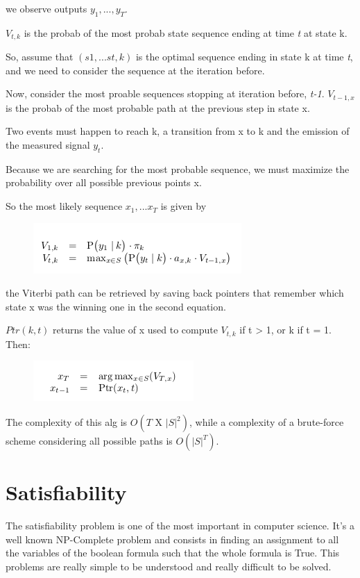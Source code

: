 \documentclass[10pt]{article}
\begin{document}
we observe outputs $ y_1, ..., y_T $.

$ V_{t,k} $ is the probab of the most probab state sequence ending at time \textit{t} at state k.

So, assume that $ (s1, ... s{t}, k) $ is the optimal sequence ending in state k at time \textit{t}, and we need to consider the sequence at the iteration before.

Now, consider the most proable sequences stopping at iteration before, \textit{t-1}. $ V_{t-1, x} $ is the probab of the most probable path at the previous step in state x. 

Two events must happen to reach k, a transition from x to k and the emission of the measured signal $ y_t $.

Because we are searching for the most probable sequence, we must maximize the probability over all possible previous points x.

So the most likely sequence $ x_1, ... x_T $ is given by

\begin{figure}[H]
\includegraphics[scale=0.60]{V}
\centering
\end{figure}

the Viterbi path can be retrieved by saving back pointers that remember which state x was the winning one in the second equation.

$ Ptr(k,t) $ returns the value of x used to compute $ V_{t,k} $ if t > 1, or k if t = 1. Then:

\begin{figure}[H]
\includegraphics[scale=0.60]{x}
\centering
\end{figure}

The complexity of this alg is $ O(T \text{ X } |S|^2) $, while a complexity of a brute-force scheme considering all possible paths is $ O(|S|^T) $.


\section{Satisfiability}
The satisfiability problem is one of the most important in computer science. It's a well known NP-Complete problem and consists in finding an assignment to all the variables of the boolean formula such that the whole formula is True. This problems are really simple to be understood and really difficult to be solved.
\end{document}
